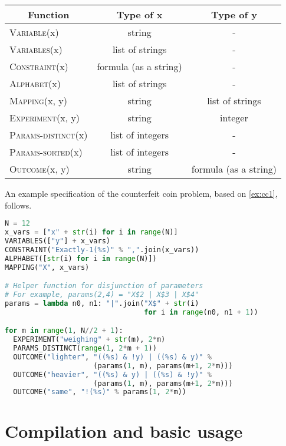 \begin{center}
\begin{tabular}{lcc}
 \multicolumn{1}{c}{\textbf{Function}} & \textbf{Type of x} & \textbf{Type of y} \\\hline
\textsc{Variable}(x) & string & - \\
\textsc{Variables}(x) & list of strings & -\\
\textsc{Constraint}(x) & formula (as a string)& -\\
\textsc{Alphabet}(x) & list of strings & -\\
\textsc{Mapping}(x, y) & string & list of strings\\
\textsc{Experiment}(x, y) & string & integer \\
\textsc{Params-distinct}(x) & list of integers & -\\
\textsc{Params-sorted}(x) & list of integers & -\\
\textsc{Outcome}(x, y) & string & formula (as a string)
\end{tabular}
\end{center}

\begin{example}
An example specification of the counterfeit coin problem,
based on \autoref{ex:cc1}, follows.
\begin{lstlisting}[language=Python]
N = 12
x_vars = ["x" + str(i) for i in range(N)]
VARIABLES(["y"] + x_vars)
CONSTRAINT("Exactly-1(%s)" % ",".join(x_vars))
ALPHABET([str(i) for i in range(N)])
MAPPING("X", x_vars)

# Helper function for disjunction of parameters
# For example, params(2,4) = "X$2 | X$3 | X$4"
params = lambda n0, n1: "|".join("X$" + str(i)
                                 for i in range(n0, n1 + 1))

for m in range(1, N//2 + 1):
  EXPERIMENT("weighing" + str(m), 2*m)
  PARAMS_DISTINCT(range(1, 2*m + 1))
  OUTCOME("lighter", "((%s) & !y) | ((%s) & y)" %
                     (params(1, m), params(m+1, 2*m)))
  OUTCOME("heavier", "((%s) & y) | ((%s) & !y)" %
                     (params(1, m), params(m+1, 2*m)))
  OUTCOME("same", "!(%s)" % params(1, 2*m))
\end{lstlisting}
\end{example}



\section{Compilation and basic usage}

